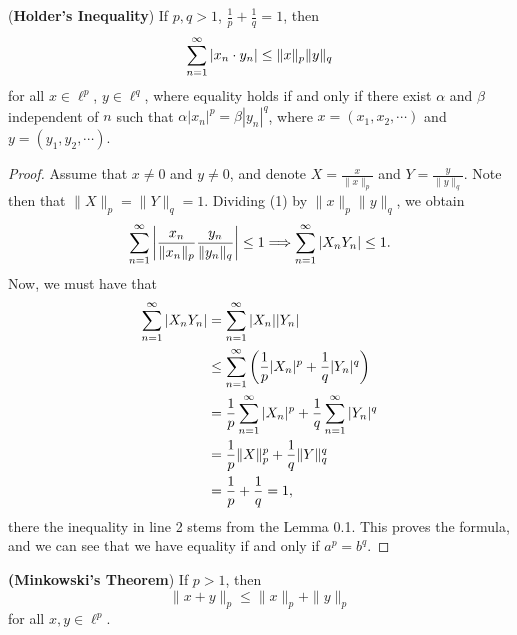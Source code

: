 \begin{theorem}
(\textbf{Holder's Inequality}) If $p, q > 1$, $\frac{1}{p} + \frac{1}{q} = 1$, then 
\begin{equation}
\sum\limits_{n = 1}^{\infty} |x_n \cdot y_n| \leq \| x \|_p \| y \|_q 
\end{equation}
for all $x \in \ell^{p}$, $y \in \ell^{q}$, where equality holds if and only if there exist $\alpha$ and $\beta$ independent of $n$ such that $\alpha | x_n |^p = \beta | y_n |^q$, where $x = (x_1, x_2, \cdots)$ and $y = (y_1, y_2, \cdots)$. 
\end{theorem}
\begin{proof}
Assume that $x \neq 0$ and $y \neq 0$, and denote $X = \frac{x}{\| x \|_p}$ and $Y = \frac{y}{\|y \|_q}$. Note then that $\|X \|_p = \| Y \|_q = 1$. Dividing (1) by $\| x \|_p \| y \|_q$, we obtain
\[ \sum\limits_{n = 1}^{\infty} \left| \frac{x_n}{\| x_n \|_p }\frac{y_n}{\|y_n \|_q} \right| \leq 1 \Longrightarrow \sum\limits_{n = 1}^{\infty} | X_n Y_n | \leq 1. \]
Now, we must have that 
\begin{align*}
\sum\limits_{n = 1}^{\infty} |X_n Y_n | & = \sum\limits_{n = 1}^{\infty} |X_n| |Y_n| \\
& \leq \sum\limits_{n = 1}^{\infty} \left( \frac{1}{p} |X_n|^p + \frac{1}{q} |Y_n|^q \right) \\
& = \frac{1}{p} \sum\limits_{n = 1}^{\infty} |X_n|^p + \frac{1}{q} \sum\limits_{n = 1}^{\infty} |Y_n|^q \\
& = \frac{1}{p} \| X\|_p^p  + \frac{1}{q} \| Y \|_q^q \\
& = \frac{1}{p} + \frac{1}{q} = 1,
\end{align*}
there the inequality in line 2 stems from the Lemma 0.1. This proves the formula, and we can see that we have equality if and only if $a^p = b^q$. 
\end{proof}
\begin{theorem}
\textbf{(Minkowski's Theorem}) If $p > 1$, then 
\begin{equation}
\| x + y \|_p \leq \| x \|_p + \| y \|_p
\end{equation}
for all $x, y \in \ell^p$.
\end{theorem}
